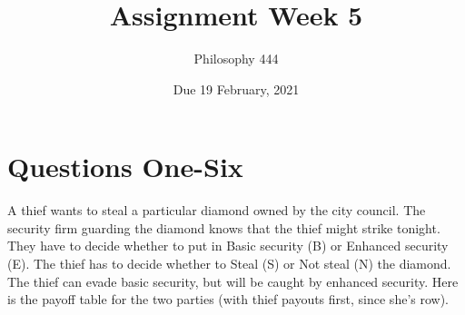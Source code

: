 \documentclass[
  11pt,
]{article}
\title{Assignment Week 5}
\author{Philosophy 444}
\date{Due 19 February, 2021}
\begin{document}
\maketitle

\hypertarget{questions-one-six}{%
\section{Questions One-Six}\label{questions-one-six}}

A thief wants to steal a particular diamond owned by the city council.
The security firm guarding the diamond knows that the thief might strike
tonight. They have to decide whether to put in Basic security (B) or
Enhanced security (E). The thief has to decide whether to Steal (S) or
Not steal (N) the diamond. The thief can evade basic security, but will
be caught by enhanced security. Here is the payoff table for the two
parties (with thief payouts first, since she's row).

 
  \providecommand{\huxb}[2]{\arrayrulecolor[RGB]{#1}\global\arrayrulewidth=#2pt}
  \providecommand{\huxvb}[2]{\color[RGB]{#1}\vrule width #2pt}
  \providecommand{\huxtpad}[1]{\rule{0pt}{#1}}
  \providecommand{\huxbpad}[1]{\rule[-#1]{0pt}{#1}}
\end{document}
